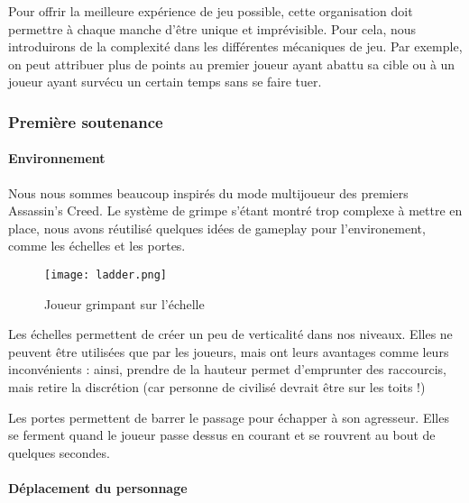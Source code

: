 			Pour offrir la meilleure expérience de jeu possible, cette organisation doit permettre à chaque manche d'être unique et imprévisible.
			Pour cela, nous introduirons de la complexité dans les différentes mécaniques de jeu. Par exemple, on peut attribuer plus de points
			au premier joueur ayant abattu sa cible ou à un joueur ayant survécu un certain temps sans se faire tuer.


	\vspace{0.5cm}		
	\subsubsection{Première soutenance}
	\vspace{0.5cm}

        \paragraph{Environnement}

            Nous nous sommes beaucoup inspirés du mode multijoueur des premiers Assassin's Creed. Le système de grimpe s'étant 
			montré trop complexe à mettre en place, nous avons réutilisé quelques idées de gameplay pour l'environement, comme les échelles et les portes.

            \begin{figure}[hbt!]
                \centering
                \texttt{[image: ladder.png]}
                \caption{Joueur grimpant sur l'échelle}
            \end{figure}
			\FloatBarrier

            Les échelles permettent de créer un peu de verticalité dans nos niveaux.
            Elles ne peuvent être utilisées que par les joueurs, mais ont leurs avantages comme leurs inconvénients : ainsi,
            prendre de la hauteur permet d'emprunter des raccourcis, mais retire la discrétion (car personne de civilisé devrait être sur les toits !)
            
            Les portes permettent de barrer le passage pour échapper à son agresseur.
            Elles se ferment quand le joueur passe dessus en courant
            et se rouvrent au bout de quelques secondes.



        \paragraph{Déplacement du personnage}
            
